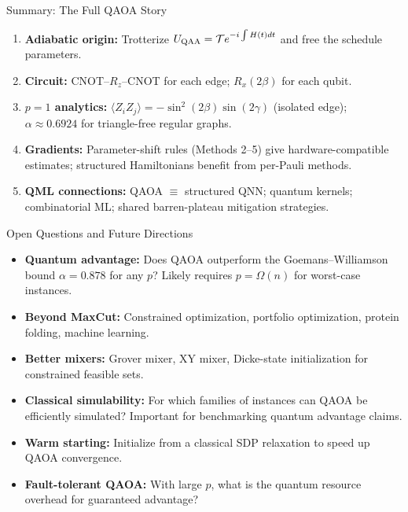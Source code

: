\documentclass{beamer}
\begin{document}
\begin{frame}
\begin{frame}{Summary: The Full QAOA Story}
\begin{enumerate}
\item \textbf{Adiabatic origin:}
  Trotterize $U_{\rm QAA} = \mathcal{T}e^{-i\int H(t)dt}$ and free
  the schedule parameters.

\item \textbf{Circuit:}
  CNOT--$R_z$--CNOT for each edge; $R_x(2\beta)$ for each qubit.

\item \textbf{$p=1$ analytics:}
  $\langle Z_iZ_j\rangle = -\sin^2(2\beta)\sin(2\gamma)$ (isolated edge);
  $\alpha \approx 0.6924$ for triangle-free regular graphs.

\item \textbf{Gradients:}
  Parameter-shift rules (Methods 2--5) give hardware-compatible
  estimates; structured Hamiltonians benefit from per-Pauli methods.

\item \textbf{QML connections:}
  QAOA $\equiv$ structured QNN; quantum kernels; combinatorial ML;
  shared barren-plateau mitigation strategies.
\end{enumerate}
\end{frame}


\begin{frame}{Open Questions and Future Directions}
\begin{itemize}
\item \textbf{Quantum advantage:} Does QAOA outperform the
  Goemans--Williamson bound $\alpha=0.878$ for any $p$? Likely
  requires $p = \Omega(n)$ for worst-case instances.
\item \textbf{Beyond MaxCut:} Constrained optimization, portfolio
  optimization, protein folding, machine learning.
\item \textbf{Better mixers:} Grover mixer, XY mixer, Dicke-state
  initialization for constrained feasible sets.
\item \textbf{Classical simulability:} For which families of
  instances can QAOA be efficiently simulated? Important for
  benchmarking quantum advantage claims.
\item \textbf{Warm starting:} Initialize from a classical SDP
  relaxation to speed up QAOA convergence.
\item \textbf{Fault-tolerant QAOA:} With large $p$, what is the
  quantum resource overhead for guaranteed advantage?
\end{itemize}
\end{frame}


\end{frame}
\end{document}
